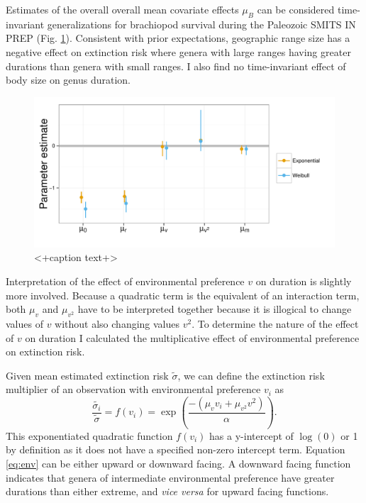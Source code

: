\documentclass[12pt,letterpaper]{article}
\begin{document}
Estimates of the overall overall mean covariate effects \(\mu_{B}\) can be considered time-invariant generalizations for brachiopod survival during the Paleozoic \uppercase{Smits in prep} (Fig. \ref{fig:mu}). Consistent with prior expectations, geographic range size has a negative effect on extinction risk where genera with large ranges having greater durations than genera with small ranges. I also find no time-invariant effect of body size on genus duration. 
\begin{figure}[ht]
  \centering
  \includegraphics[height = 0.5\textheight,width=\textwidth,keepaspectratio=true]{figure/coef_means}
  \caption{<+caption text+>}
  \label{fig:mu}
\end{figure}

Interpretation of the effect of environmental preference \(v\) on duration is slightly more involved. Because a quadratic term is the equivalent of an interaction term, both \(\mu_{v}\) and \(\mu_{v^{2}}\) have to be interpreted together because it is illogical to change values of \(v\) without also changing values \(v^{2}\). To determine the nature of the effect of \(v\) on duration I calculated the multiplicative effect of environmental preference on extinction risk.

Given mean estimated extinction risk \(\tilde{\sigma}\), we can define the extinction risk multiplier of an observation with environmental preference \(v_{i}\) as 
\begin{equation}
  \frac{\tilde{\sigma_{i}}}{\tilde{\sigma}} = f(v_{i}) = \exp\left(\frac{-(\mu_{v} v_{i} + \mu_{v^{2}} v^{2})}{\alpha}\right).
  \label{eq:env}
\end{equation}
This exponentiated quadratic function \(f(v_{i})\) has a y-intercept of \(\log(0)\) or 1 by definition as it does not have a specified non-zero intercept term. Equation \ref{eq:env} can be either upward or downward facing. A downward facing function indicates that genera of intermediate environmental preference have greater durations than either extreme, and \textit{vice versa} for upward facing functions.
\end{document}

